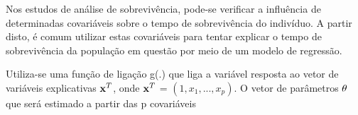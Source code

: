 \documentclass[
	article,
	12pt,				%
	openright,			%
	twoside,			%
	a4paper,			%
	english,			%
	french,				%
	spanish,			%
	brazil				%
	]{abntex2}
\begin{document}
Nos estudos de análise de sobrevivência, pode-se verificar a influência de determinadas covariáveis sobre o tempo de sobrevivência do indivíduo. A partir disto, é comum utilizar estas covariáveis para tentar explicar o tempo de sobrevivência da população em questão por meio de um modelo de regressão.

Utiliza-se uma função de ligação g(.) que liga a variável resposta ao vetor de variáveis explicativas $\bold{x}^T$, onde $\bold{x}^T$  = $(1, x_1, ..., x_p)$. O vetor de parâmetros $\bold{\theta}$ que será estimado a partir das p covariáveis

\newpage

\end{document}
